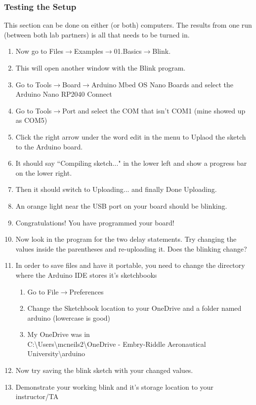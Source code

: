 \subsubsection{Testing the Setup}
This section can be done on either (or both) computers. The results from one run (between both lab partners)
is all that needs to be turned in.
\begin{enumerate}
	\item Now go to Files$\rightarrow$Examples$\rightarrow$01.Basics$\rightarrow$Blink.
	\item This will open another window with the Blink program.
	\item Go to Tools$\rightarrow$Board$\rightarrow$Arduino Mbed OS Nano Boards and select the Arduino Nano RP2040 Connect
	\item Go to Tools$\rightarrow$Port and select the COM that isn't COM1 (mine showed up as COM5)
	\item Click the right arrow under the word edit in the menu to Uplaod the sketch to the Arduino board.
	\item It should say ``Compiling sketch..." in the lower left and show a progress bar on the lower right.
	\item Then it should switch to Uploading... and finally Done Uploading.
	\item An orange light near the USB port on your board should be blinking.
	\item Congratulations! You have programmed your board!
	\item Now look in the program for the two delay statements. Try changing the values inside the parentheses and re-uploading it. Does the blinking change?
	\item In order to save files and have it portable, you need to change the directory where the Arduino IDE stores it's sketchbooks
	\begin{enumerate}
		\item Go to File$\rightarrow$Preferences
		\item Change the Sketchbook location to your OneDrive and a folder named arduino (lowercase is good)
		\item My OneDrive was in \\C:\textbackslash Users\textbackslash mcneils2\textbackslash OneDrive - Embry-Riddle 
		Aeronautical University\textbackslash arduino
	\end{enumerate}
	\item Now try saving the blink sketch with your changed values.
	\item Demonstrate your working blink and it's storage location to your instructor/TA

\end{enumerate}
